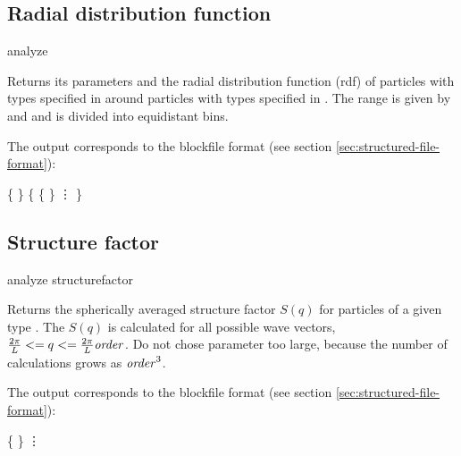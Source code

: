 
\subsection{Radial distribution function}
\label{analyze:rdf}
\label{analyze:<rdf>}

\begin{essyntax}
  analyze  
    
\end{essyntax}
Returns its parameters and the radial distribution function (rdf) of
particles with types specified in  around
particles with types specified in . The range
is given by  and  and is divided into
 equidistant bins.


The output corresponds to the blockfile format (see section
\vref{sec:structured-file-format}):
\begin{code}
\{  \} 
\{ 
  \{   \} 
  \vdots
\}
\end{code}

\subsection{Structure factor}
\label{analyze:structurefactor}

\begin{essyntax}
  analyze structurefactor  
\end{essyntax}

Returns the spherically averaged structure factor $S(q)$ for particles
of a given type . The $S(q)$ is calculated for all possible
wave vectors, $\frac{2\pi}{L} <= q <= \frac{2\pi}{L}\var{order}$. Do
not chose parameter  too large, because the number of
calculations grows as $\var{order}^3$. 



The output corresponds to the blockfile format (see section
\vref{sec:structured-file-format}):
\begin{code}
\{   \} 
\vdots
\end{code}

